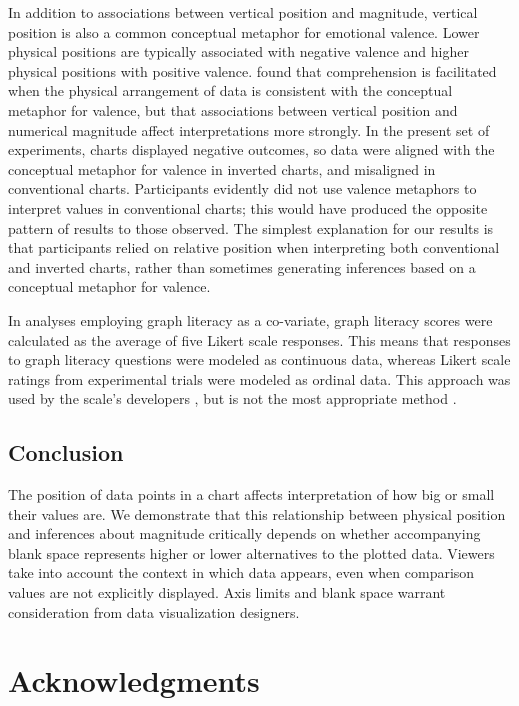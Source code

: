 \documentclass[journal]{vgtc}                %
\begin{document}
In addition to associations between vertical position and magnitude,
vertical position is also a common conceptual metaphor for emotional
valence. Lower physical positions are typically associated with negative
valence and higher physical positions with positive valence.
\citet{woodin_conceptual_2022} found that comprehension is facilitated when the
physical arrangement of data is consistent with the conceptual metaphor
for valence, but that associations between vertical position and
numerical magnitude affect interpretations more strongly. In the present
set of experiments, charts displayed negative outcomes, so data were
aligned with the conceptual metaphor for valence in inverted charts, and
misaligned in conventional charts. Participants evidently did not use
valence metaphors to interpret values in conventional charts; this would
have produced the opposite pattern of results to those observed. The
simplest explanation for our results is that participants relied on
relative position when interpreting both conventional and inverted
charts, rather than sometimes generating inferences based on a
conceptual metaphor for valence.

In analyses employing graph literacy as a co-variate, graph literacy
scores were calculated as the average of five Likert scale responses.
This means that responses to graph literacy questions were modeled as
continuous data, whereas Likert scale ratings from experimental trials
were modeled as ordinal data. This approach was used by the scale's
developers \citep{garcia-retamero_measuring_2016}, but is not the most
appropriate method \citep{liddell_analyzing_2018}.

\hypertarget{conclusion}{%
\subsection{Conclusion}\label{conclusion}}

The position of data points in a chart affects interpretation of how big
or small their values are. We demonstrate that this relationship between
physical position and inferences about magnitude critically depends on
whether accompanying blank space represents higher or lower alternatives
to the plotted data. Viewers take into account the context in which data
appears, even when comparison values are not explicitly displayed. Axis
limits and blank space warrant consideration from data visualization
designers.

\hypertarget{acknowledgments}{%
\section*{Acknowledgments}\label{acknowledgments}}
\end{document}
